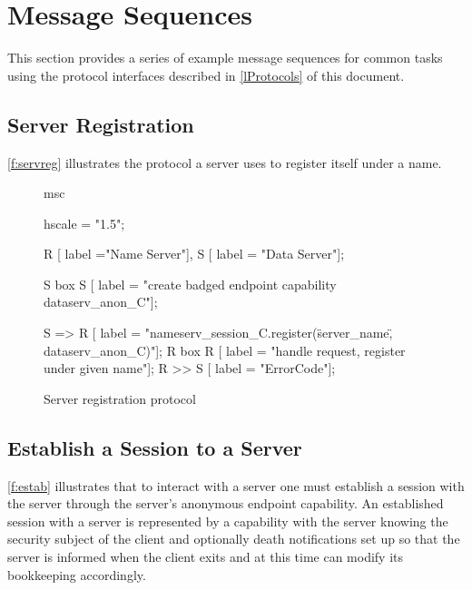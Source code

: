 %
%
%

\section{Message Sequences}

This section provides a series of example message sequences for common tasks using the protocol interfaces described in \autoref{lProtocols} of this document.

\subsection{Server Registration}

\autoref{f:servreg} illustrates the protocol a server uses to register itself under a name.

\begin{figure}[htb]
\begin{center}
\begin{msc}
msc {
    hscale = "1.5";

    R [ label ="Name Server"],
    S [ label = "Data Server"];
    
    S box S [ label = "create badged endpoint capability dataserv\_anon\_C"];
 
    S => R [ label = "nameserv\_session\_C.register(\"server\_name\", dataserv\_anon\_C)"];
    R box R [ label = "handle request, register under given name"];
    R >> S [ label = "ErrorCode"];
}
\end{msc}
\end{center}
\caption{Server registration protocol}
\label{f:servreg}
\end{figure}

\subsection{Establish a Session to a Server}


\autoref{f:estab} illustrates that to interact with a server one must establish a session with the server through the server's anonymous endpoint capability. An established session with a server is represented by a  capability with the server knowing the security subject of the client and optionally death notifications set up so that the server is informed when the client exits and at this time can modify its bookkeeping accordingly.

